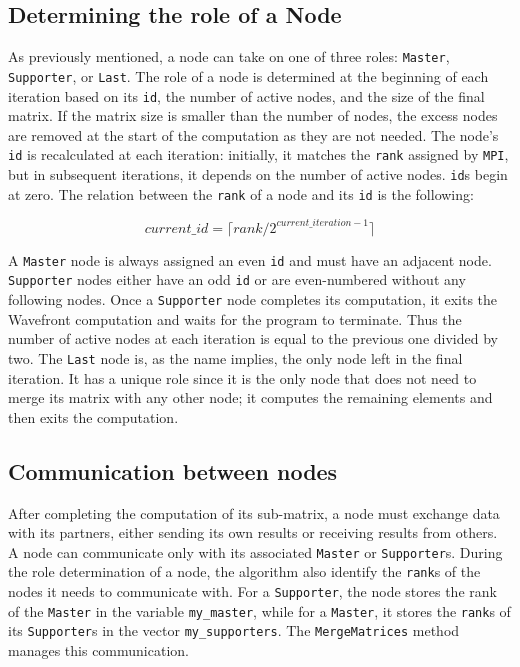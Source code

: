 \subsection*{Determining the role of a Node}
As previously mentioned, a node can take on one of three roles: \texttt{Master}, \texttt{Supporter}, or \texttt{Last}. The role of a node is determined at the beginning of each iteration based on its \texttt{id}, the number of active nodes, and the size of the final matrix. If the matrix size is smaller than the number of nodes, the excess nodes are removed at the start of the computation as they are not needed. The node's \texttt{id} is recalculated at each iteration: initially, it matches the \texttt{rank} assigned by \texttt{MPI}, but in subsequent iterations, it depends on the number of active nodes. \texttt{id}s begin at zero. The relation between the \texttt{rank} of a node and its \texttt{id} is the following:

\begin{equation}
    current\_id = \lceil rank / 2^{current\_iteration - 1}\rceil
\end{equation}

A \texttt{Master} node is always assigned an even \texttt{id} and must have an adjacent node. \texttt{Supporter} nodes either have an odd \texttt{id} or are even-numbered without any following nodes. Once a \texttt{Supporter} node completes its computation, it exits the Wavefront computation and waits for the program to terminate. Thus the number of active nodes at each iteration is equal to the previous one divided by two. The \texttt{Last} node is, as the name implies, the only node left in the final iteration. It has a unique role since it is the only node that does not need to merge its matrix with any other node; it computes the remaining elements and then exits the computation.

\subsection*{Communication between nodes}
After completing the computation of its sub-matrix, a node must exchange data with its partners, either sending its own results or receiving results from others. A node can communicate only with its associated \texttt{Master} or \texttt{Supporter}s. During the role determination of a node, the algorithm also identify the \texttt{rank}s of the nodes it needs to communicate with. For a \texttt{Supporter}, the node stores the rank of the \texttt{Master} in the variable \texttt{my\_master}, while for a \texttt{Master}, it stores the \texttt{rank}s of its \texttt{Supporter}s in the vector \texttt{my\_supporters}. The \texttt{MergeMatrices} method manages this communication.

